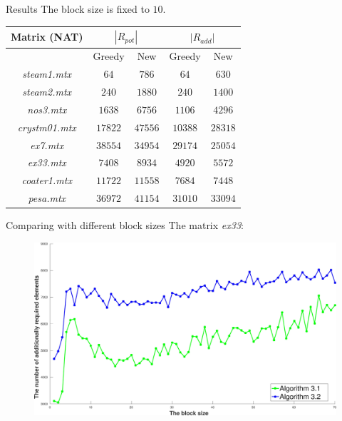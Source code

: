 \documentclass{beamer}
\begin{document}
\begin{frame}{Results}
The block size is fixed to $10$.
\begin{table}
\begin{center}
\begin{tabular}{|c|c|c|c|c|}
\hline
Matrix (NAT) & \multicolumn{2}{c|}{$|R_{pot}|$} & \multicolumn{2}{c|}{$|R_{add}|$}\\\hline
{} & Greedy & New & Greedy & New\\\hline
\textit{steam1.mtx} & $64$ & $786$ & $64$ & $630$ \\\hline
\textit{steam2.mtx} & $240$ & $1880$ & $240$ & $1400$ \\\hline
\textit{nos3.mtx} & $1638$ & $6756$ & $1106$ & $4296$ \\\hline
\textit{crystm01.mtx} & $17822$ & $47556$ & $10388$ & $28318$ \\\hline
\textit{ex7.mtx} & $38554$ & $34954$ & $29174$ & $25054$ \\\hline
\textit{ex33.mtx} & $7408$ & $8934$ & $4920$ & $5572$ \\\hline
\textit{coater1.mtx} & $11722$ & $11558$ & $7684$ & $7448$ \\\hline
\textit{pesa.mtx} & $36972$ & $41154$ & $31010$ & $33094$ \\\hline
\end{tabular}
\end{center}
\end{table}
\end{frame}

\begin{frame}{Comparing with different block sizes}
The matrix \textit{ex33}:
\begin{figure}
\centering
\includegraphics[width=0.9\linewidth]{ex33_alg31_alg32_bls_slo_add}
\end{figure}
\end{frame}
\end{document}
